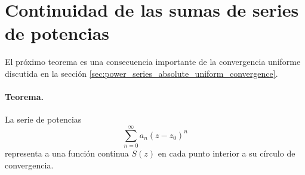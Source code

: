 \documentclass[a4paper]{report}
\begin{document}
\section{Continuidad de las sumas de series de potencias}\label{sec:power_series_continuity} 

El próximo teorema es una consecuencia importante de la convergencia uniforme discutida en la sección \ref{sec:power_series_absolute_uniform_convergence}. 

\paragraph{Teorema.} La serie de potencias
\begin{equation}\label{eq:power_series_generic_definition_tmp3}
 \sum_{n=0}^\infty a_n(z-z_0)^n 
\end{equation}
representa a una función continua \(S(z)\) en cada punto interior a su círculo de convergencia.
\end{document}
